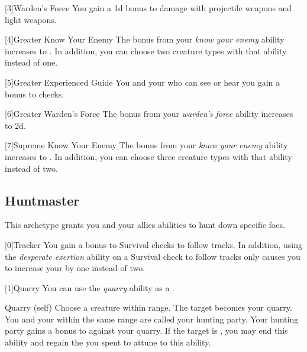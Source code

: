         [3]{Warden's Force} You gain a \plus1d bonus to damage with projectile weapons and light weapons.

        [4]{Greater Know Your Enemy} The bonus from your \textit{know your enemy} ability increases to .
        In addition, you can choose two creature types with that ability instead of one.

        [5]{Greater Experienced Guide} You and your  who can see or hear you gain a  bonus to  checks.

        [6]{Greater Warden's Force} The bonus from your \textit{warden's force} ability increases to \plus2d.

        [7]{Supreme Know Your Enemy} The bonus from your \textit{know your enemy} ability increases to .
        In addition, you can choose three creature types with that ability instead of two.

    \newpage
    \subsection{Huntmaster}
        This archetype grants you and your allies abilities to hunt down specific foes.

        [0]{Tracker} You gain a  bonus to Survival checks to follow tracks.
        In addition, using the \textit{desperate exertion} ability on a Survival check to follow tracks only causes you to increase your  by one instead of two.

        [1]{Quarry}\label{Quarry} You can use the \textit{quarry} ability as a .
        \begin{attuneability}{Quarry}
             (self)
            \rankline
            Choose a creature within \rnglong range.
            The target becomes your quarry.
            You and your  within the same range are called your hunting party.
            Your hunting party gains a  bonus to  against your quarry.
            If the target is , you may end this ability and regain the  you spent to attune to this ability.
        \end{attuneability}

